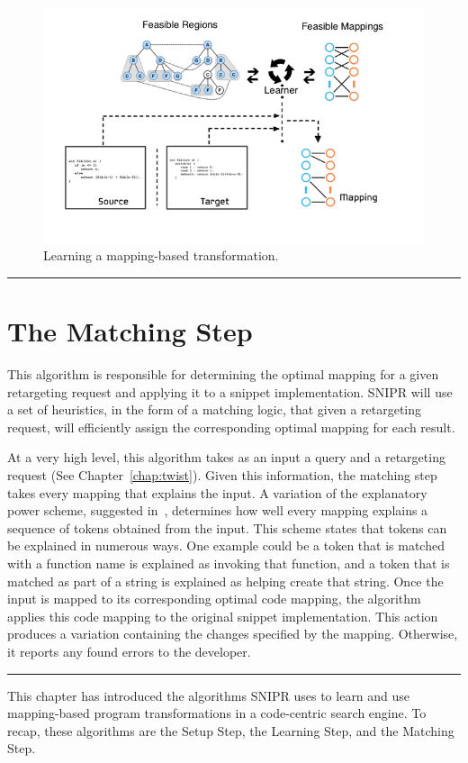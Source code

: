 \begin{figure}[!ht]
    \centering
    \includegraphics[width=\textwidth]{images/mappinggeneration}
    \caption{Learning a mapping-based transformation.}
    \label{fig:mappinggeneration}
\end{figure}

\fancybreak{\pfbreakdisplay}

\section{The Matching Step}
\label{sec:matching}

This algorithm is responsible for determining the optimal mapping for a given retargeting request and applying it to a snippet implementation. \uppercase{SNIPR} will use a set of heuristics, in the form of a matching logic, that given a retargeting request, will efficiently assign the corresponding optimal mapping for each result. 

At a very high level, this algorithm takes as an input a query and a retargeting request (See Chapter~\ref{chap:twist}). Given this information, the matching step takes every mapping that explains the input. A variation of the explanatory power scheme, suggested in~\cite{Little:2008hr}, determines how well every mapping explains a sequence of tokens obtained from the input. This scheme states that tokens can be explained in numerous ways. One example could be a token that is matched with a function name is explained as invoking that function, and a token that is matched as part of a string is explained as helping create that string. Once the input is mapped to its corresponding optimal code mapping, the algorithm applies this code mapping to the original snippet implementation. This action produces a variation containing the changes specified by the mapping. Otherwise, it reports any found errors to the developer.

\fancybreak{\pfbreakdisplay} 

This chapter has introduced the algorithms SNIPR uses to learn and use mapping-based program transformations in a code-centric search engine. To recap, these algorithms are the Setup Step, the Learning Step, and the Matching Step.
